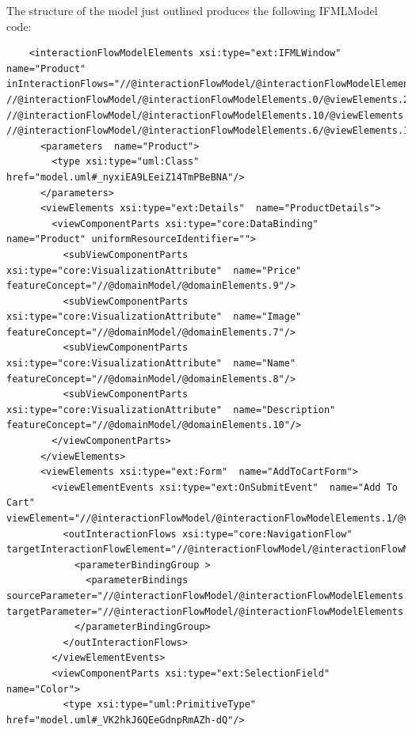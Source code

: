 \newpage
The structure of the model just outlined produces the following IFMLModel code:

\lstset{language=XML}
\begin{lstlisting} 
    <interactionFlowModelElements xsi:type="ext:IFMLWindow"  name="Product" inInteractionFlows="//@interactionFlowModel/@interactionFlowModelElements.1/@viewElements.2/@viewElementEvents.0/@outInteractionFlows.0 //@interactionFlowModel/@interactionFlowModelElements.0/@viewElements.2/@viewElementEvents.0/@outInteractionFlows.0 //@interactionFlowModel/@interactionFlowModelElements.10/@viewElements.0/@viewElementEvents.0/@outInteractionFlows.0 //@interactionFlowModel/@interactionFlowModelElements.6/@viewElements.1/@viewElements.0/@viewElementEvents.0/@outInteractionFlows.0">
      <parameters  name="Product">
        <type xsi:type="uml:Class" href="model.uml#_nyxiEA9LEeiZ14TmPBeBNA"/>
      </parameters>
      <viewElements xsi:type="ext:Details"  name="ProductDetails">
        <viewComponentParts xsi:type="core:DataBinding"  name="Product" uniformResourceIdentifier="">
          <subViewComponentParts xsi:type="core:VisualizationAttribute"  name="Price" featureConcept="//@domainModel/@domainElements.9"/>
          <subViewComponentParts xsi:type="core:VisualizationAttribute"  name="Image" featureConcept="//@domainModel/@domainElements.7"/>
          <subViewComponentParts xsi:type="core:VisualizationAttribute"  name="Name" featureConcept="//@domainModel/@domainElements.8"/>
          <subViewComponentParts xsi:type="core:VisualizationAttribute"  name="Description" featureConcept="//@domainModel/@domainElements.10"/>
        </viewComponentParts>
      </viewElements>
      <viewElements xsi:type="ext:Form"  name="AddToCartForm">
        <viewElementEvents xsi:type="ext:OnSubmitEvent"  name="Add To Cart" viewElement="//@interactionFlowModel/@interactionFlowModelElements.1/@viewElements.1">
          <outInteractionFlows xsi:type="core:NavigationFlow"  targetInteractionFlowElement="//@interactionFlowModel/@interactionFlowModelElements.9">
            <parameterBindingGroup >
              <parameterBindings  sourceParameter="//@interactionFlowModel/@interactionFlowModelElements.1/@viewElements.1/@viewComponentParts.2" targetParameter="//@interactionFlowModel/@interactionFlowModelElements.1/@viewElements.1/@viewComponentParts.2"/>
            </parameterBindingGroup>
          </outInteractionFlows>
        </viewElementEvents>
        <viewComponentParts xsi:type="ext:SelectionField"  name="Color">
          <type xsi:type="uml:PrimitiveType" href="model.uml#_VK2hkJ6QEeGdnpRmAZh-dQ"/>

\end{lstlisting}
